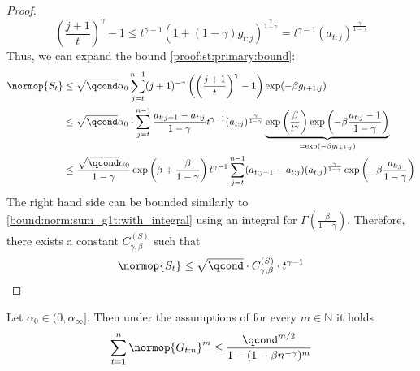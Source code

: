 \begin{proof}
    \begin{equation}
        \left(\frac{j+1}{t}\right)^{\gamma} - 1 \leq t^{\gamma-1} \left(1 + (1-\gamma) g_{t:j}\right)^{\frac{\gamma}{1-\gamma}} = t^{\gamma - 1} (a_{t:j})^{\frac{\gamma}{1-\gamma}}
    \end{equation}
    Thus, we can expand the bound \eqref{proof:st:primary:bound}:
    \begin{align}
        \normop{S_t} &\leq \sqrt{\qcond} \alpha_0 \sum_{j=t}^{n-1} (j+1)^{-\gamma} \left( \left(\frac{j+1}{t}\right)^{\gamma}  - 1\right) \exp(-\beta g_{t+1:j}) \\ &\leq \sqrt{\qcond} \alpha_0 \cdot \sum_{j=t}^{n-1} \frac{a_{t:j+1} - a_{t:j}}{1-\gamma} t^{\gamma-1} (a_{t:j})^{\frac{\gamma}{1-\gamma}} \underbrace{\exp\left(\frac{\beta}{t^{\gamma}}\right) \exp\left(-\beta\frac{a_{t:j} - 1}{1-\gamma}\right)}_{=\exp(-\beta g_{t+1:j})} \\ 
        &\leq \frac{\sqrt{\qcond} \alpha_0}{1-\gamma} \exp\left(\beta+ \frac{\beta}{1-\gamma}\right) t^{\gamma-1} \sum_{j=t}^{n-1} (a_{t:j+1} - a_{t:j})  (a_{t:j})^{\frac{\gamma}{1-\gamma}} \exp\left(-\beta\frac{a_{t:j}}{1-\gamma}\right)
    \end{align}
    The right hand side can be bounded similarly to \eqref{bound:norm:sum_g1t:with_integral} using an integral for $\Gamma\left(\frac{\beta}{1-\gamma}\right)$. Therefore, there exists a constant $C_{\gamma, \beta}^{(S)}$ such that 
    \begin{align}
        \normop{S_t} \leq \sqrt{\qcond} \cdot C_{\gamma, \beta}^{(S)} \cdot t^{\gamma-1}
    \end{align}
\end{proof}

\begin{proposition}
    \label{prop:g_t:n_upperbound}
    Let $\alpha_0 \in (0, \alpha_{\infty}]$. Then under the assumptions of {} for every $m \in \mathbb{N}$ it holds
    \begin{equation}
        \sum_{t=1}^n \normop{G_{t:n}}^m \leq \frac{\qcond^{m/2}}{1-(1-\beta n^{-\gamma})^m}
    \end{equation}
\end{proposition}

